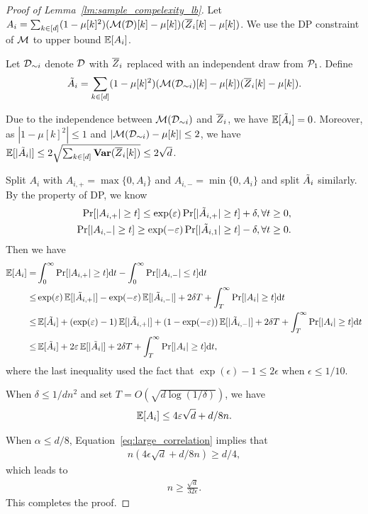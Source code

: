 \begin{proof}[Proof of Lemma~\ref{lm:sample_compelexity_lb}]

Let $A_i=\sum_{k\in[d]}(1-\mu[k]^2)(\mathcal{M}(\mathcal{D})[k]-\mu[k])(\overline{Z}_i[k]-\mu[k])$.
We use the DP constraint of $\mathcal{M}$ to upper bound $\operatorname*{\mathbb{E}}[A_i]$.

Let $\mathcal{D}_{\sim i}$ denote $\mathcal{D}$ with $\overline{Z}_i$ replaced with an independent draw from $\mathcal{P}_1$.
Define 
\begin{align*}
    \Tilde{A}_i=\sum_{k\in[d]}(1-\mu[k]^2)(\mathcal{M}(\mathcal{D}_{\sim i})[k]-\mu[k])(\overline{Z}_i[k]-\mu[k]).
\end{align*}

Due to the independence between $\mathcal{M}(\mathcal{D}_{\sim i})$ and $\overline{Z}_i$, we have $\operatorname*{\mathbb{E}}[\Tilde{A}_i]=0$.
Moreover, as $|1-\mu[k]^2|\le 1$ and $|\mathcal{M}(\mathcal{D}_{\sim i})-\mu[k]|\le 2$, 
we have $\operatorname*{\mathbb{E}}[|\Tilde{A}_i|]\le 2 \sqrt{\sum_{k \in [d]} \operatorname*{\mathbf{Var}}(\overline{Z}_i[k])}\le 2\sqrt{d}$.

Split $A_i$ with $A_{i,+}=\max\{0,A_i\}$ and $A_{i,-}=\min\{0,A_i\}$ and split $\Tilde{A}_{i}$ similarly.
By the property of DP, we know 
\begin{align*}
    \Pr[|A_{i,+}|\ge t]\le \exp(\varepsilon)\Pr[|\Tilde{A}_{i,+}|\ge t]+\delta,\forall t\ge 0,\\
    \Pr[|A_{i,-}|\ge t]\ge \exp(-\varepsilon)\Pr[|\Tilde{A}_{i,1}|\ge t]-\delta, \forall t\ge 0.
\end{align*}
Then we have
\begin{align*}
    \operatorname*{\mathbb{E}}[A_i]=& \int_{0}^{\infty}\Pr[|A_{i,+}|\ge t] \mathrm{d} t- \int_{0}^{\infty} \Pr[|A_{i,-}|\le t]\mathrm{d} t\\
    \le & \exp(\varepsilon) \operatorname*{\mathbb{E}}[|\Tilde{A}_{i,+}|]-\exp(-\varepsilon)\operatorname*{\mathbb{E}}[|\Tilde{A}_{i,-}|]+2\delta T+ \int_{T}^{\infty}\Pr[|A_i|\ge t]\mathrm{d} t\\
    \le & \operatorname*{\mathbb{E}}[\Tilde{A}_i]+(\exp(\varepsilon)-1)\operatorname*{\mathbb{E}}[|\Tilde{A}_{i,+}|]+ (1-\exp(-\varepsilon))\operatorname*{\mathbb{E}}[|\Tilde{A}_{i,-}|]+2\delta T+\int_{T}^{\infty}\Pr[|A_i|\ge t]\mathrm{d} t\\
    \le & \operatorname*{\mathbb{E}}[\Tilde{A}_i]+2\varepsilon \operatorname*{\mathbb{E}}[|\Tilde{A}_i|]+2\delta T+\int_{T}^{\infty}\Pr[|A_i|\ge t]\mathrm{d} t,
\end{align*}
where the last inequality used the fact that $\exp(\epsilon)-1\le 2\epsilon$ when $\epsilon\le 1/10$.

When $\delta\le 1/dn^2$ and set $T=O(\sqrt{d\log(1/\delta)})$, we have
\begin{align*}
    \operatorname*{\mathbb{E}}[A_i]\le 4\varepsilon \sqrt{d}+ d/8n.
\end{align*}

When $\alpha\le d/8$, Equation~\eqref{eq:large_correlation} implies that
\begin{align*}
    n(4\epsilon \sqrt{d}+ d/8n)\ge d/4,
\end{align*}
which leads to
\begin{align*}
    n\ge \frac{\sqrt{d}}{32 \epsilon}.
\end{align*}
This completes the proof.
\end{proof}


